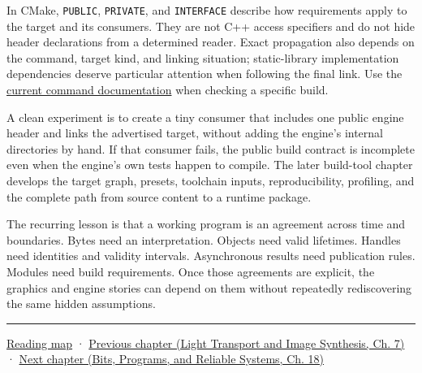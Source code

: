 In CMake, \texttt{PUBLIC}, \texttt{PRIVATE}, and \texttt{INTERFACE} describe how requirements apply to the target and its consumers. They are not C++ access specifiers and do not hide header declarations from a determined reader. Exact propagation also depends on the command, target kind, and linking situation; static-library implementation dependencies deserve particular attention when following the final link. Use the \href{https://cmake.org/cmake/help/latest/command/target_link_libraries.html}{current command documentation} when checking a specific build.

A clean experiment is to create a tiny consumer that includes one public engine header and links the advertised target, without adding the engine's internal directories by hand. If that consumer fails, the public build contract is incomplete even when the engine's own tests happen to compile. The later build-tool chapter develops the target graph, presets, toolchain inputs, reproducibility, profiling, and the complete path from source content to a runtime package.

The recurring lesson is that a working program is an agreement across time and boundaries. Bytes need an interpretation. Objects need valid lifetimes. Handles need identities and validity intervals. Asynchronous results need publication rules. Modules need build requirements. Once those agreements are explicit, the graphics and engine stories can depend on them without repeatedly rediscovering the same hidden assumptions.

\begin{center}\rule{0.5\linewidth}{0.5pt}\end{center}

\hyperref[volume-reading-map]{Reading map} · \href{../04-Light-Transport-and-Image-Synthesis/main.pdf\#nameddest=03-visual-computing-i-ch015-rasterization-foundations-and-renderer-evidence}{Previous chapter (Light Transport and Image Synthesis, Ch. 7)} · \href{../01-Bits-Programs-and-Reliable-Systems/main.pdf\#nameddest=03-visual-computing-i-ch017-build-test-and-reproduce-the-program}{Next chapter (Bits, Programs, and Reliable Systems, Ch. 18)}
